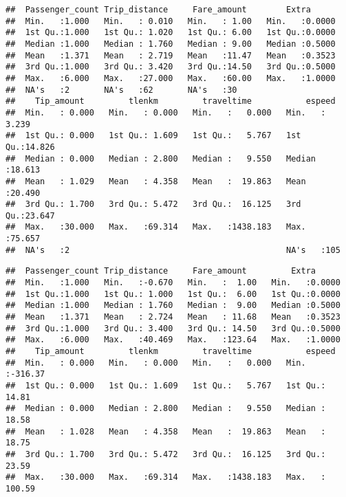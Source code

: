 \documentclass[
  18pt,
  a4paper]{article}
\newenvironment{Shaded}{\begin{snugshade}}{\end{snugshade}}
\newcommand{\DataTypeTok}[1]{\textcolor[rgb]{0.13,0.29,0.53}{#1}}
\newcommand{\DecValTok}[1]{\textcolor[rgb]{0.00,0.00,0.81}{#1}}
\newcommand{\KeywordTok}[1]{\textcolor[rgb]{0.13,0.29,0.53}{\textbf{#1}}}
\newcommand{\NormalTok}[1]{#1}
\newcommand{\OperatorTok}[1]{\textcolor[rgb]{0.81,0.36,0.00}{\textbf{#1}}}
\begin{document}
\begin{verbatim}
##  Passenger_count Trip_distance     Fare_amount        Extra       
##  Min.   :1.000   Min.   : 0.010   Min.   : 1.00   Min.   :0.0000  
##  1st Qu.:1.000   1st Qu.: 1.020   1st Qu.: 6.00   1st Qu.:0.0000  
##  Median :1.000   Median : 1.760   Median : 9.00   Median :0.5000  
##  Mean   :1.371   Mean   : 2.719   Mean   :11.47   Mean   :0.3523  
##  3rd Qu.:1.000   3rd Qu.: 3.420   3rd Qu.:14.50   3rd Qu.:0.5000  
##  Max.   :6.000   Max.   :27.000   Max.   :60.00   Max.   :1.0000  
##  NA's   :2       NA's   :62       NA's   :30                      
##    Tip_amount         tlenkm         traveltime           espeed      
##  Min.   : 0.000   Min.   : 0.000   Min.   :   0.000   Min.   : 3.239  
##  1st Qu.: 0.000   1st Qu.: 1.609   1st Qu.:   5.767   1st Qu.:14.826  
##  Median : 0.000   Median : 2.800   Median :   9.550   Median :18.613  
##  Mean   : 1.029   Mean   : 4.358   Mean   :  19.863   Mean   :20.490  
##  3rd Qu.: 1.700   3rd Qu.: 5.472   3rd Qu.:  16.125   3rd Qu.:23.647  
##  Max.   :30.000   Max.   :69.314   Max.   :1438.183   Max.   :75.657  
##  NA's   :2                                            NA's   :105
\end{verbatim}

\begin{Shaded}
\end{Shaded}

\begin{verbatim}
##  Passenger_count Trip_distance     Fare_amount         Extra       
##  Min.   :1.000   Min.   :-0.670   Min.   :  1.00   Min.   :0.0000  
##  1st Qu.:1.000   1st Qu.: 1.000   1st Qu.:  6.00   1st Qu.:0.0000  
##  Median :1.000   Median : 1.760   Median :  9.00   Median :0.5000  
##  Mean   :1.371   Mean   : 2.724   Mean   : 11.68   Mean   :0.3523  
##  3rd Qu.:1.000   3rd Qu.: 3.400   3rd Qu.: 14.50   3rd Qu.:0.5000  
##  Max.   :6.000   Max.   :40.469   Max.   :123.64   Max.   :1.0000  
##    Tip_amount         tlenkm         traveltime           espeed       
##  Min.   : 0.000   Min.   : 0.000   Min.   :   0.000   Min.   :-316.37  
##  1st Qu.: 0.000   1st Qu.: 1.609   1st Qu.:   5.767   1st Qu.:  14.81  
##  Median : 0.000   Median : 2.800   Median :   9.550   Median :  18.58  
##  Mean   : 1.028   Mean   : 4.358   Mean   :  19.863   Mean   :  18.75  
##  3rd Qu.: 1.700   3rd Qu.: 5.472   3rd Qu.:  16.125   3rd Qu.:  23.59  
##  Max.   :30.000   Max.   :69.314   Max.   :1438.183   Max.   : 100.59
\end{verbatim}
\end{document}
